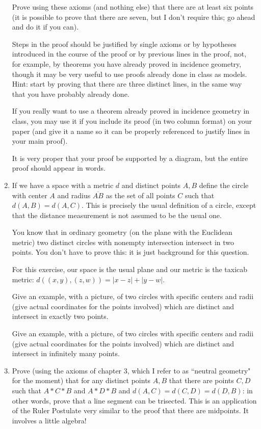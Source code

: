 \documentclass[12pt]{article}
\begin{document}
\begin{enumerate}
\begin{description}
\end{description}

Prove using these axioms (and nothing else) that there are at least six points (it is possible to prove that there are seven, but I don't require this;  go ahead and do it if you can).

Steps in the proof should be justified by single axioms or by hypotheses introduced in the course of the proof or by previous lines in the proof, not, for example, by theorems you have already proved in incidence geometry, though it may be very useful to use proofs already done in class as models.  Hint:  start by proving that there are three distinct lines, in the same way that you have probably already done.

If you really want to use a theorem already proved in incidence geometry in class, you may use it if you include its proof (in two column format) on your paper (and give it a name so it can be properly referenced to justify lines in your main proof).

It is very proper that your proof be supported by a diagram, but the entire proof should appear in words.

\newpage

\item  If we have a space with a metric $d$ and distinct points $A, B$ define the circle with center $A$ and radius $\overline{AB}$ as the set of all points
$C$ such that $d(A,B)=d(A,C)$.  This is precisely the usual definition of a circle, except that the distance measurement is not assumed to be the usual one.

You know that in ordinary geometry (on the plane with the Euclidean metric) two distinct circles with nonempty intersection intersect in two points.  You don't have to prove this:  it is just background for this question.

For this exercise, our space is the usual plane and our metric is the taxicab metric:  $d((x,y),(z,w)) = |x-z| + |y-w|$.

Give an example, with a picture, of two circles with specific centers and radii (give actual coordinates for the points involved) which are distinct and intersect in exactly two points.

Give an example, with a picture, of two circles with specific centers and radii (give actual coordinates for the points involved) which are distinct and intersect in infinitely many points.

\newpage

\item  Prove (using the axioms of chapter 3, which I refer to as ``neutral geometry" for the moment) that for any distinct points $A,B$ that there are
points $C,D$ such that $A*C*B$ and $A*D*B$ and $d(A,C) = d(C,D) = d(D,B)$:  in other words, prove that a line segment can be trisected.  This is an application
of the Ruler Postulate very similar to the proof that there are midpoints.  It involves a little algebra!


\end{enumerate}
\end{document}
